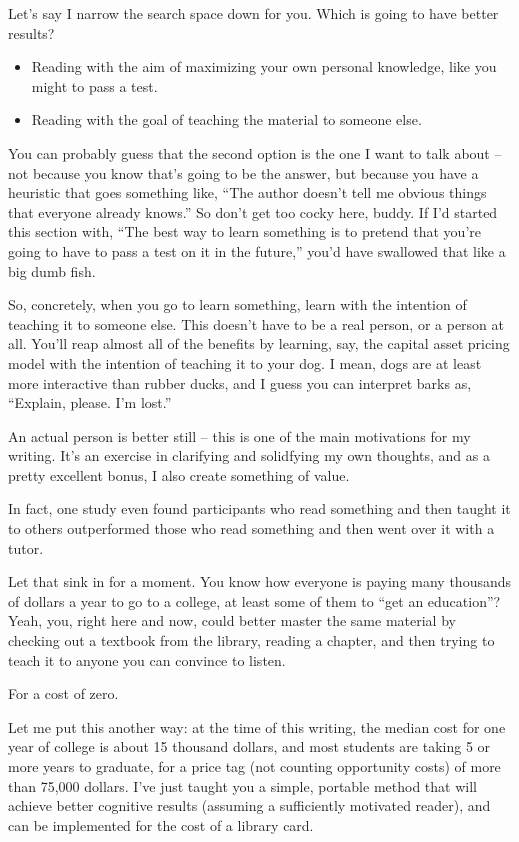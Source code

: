 Let's say I narrow the search space down for you. Which is going to have
better results?

\begin{itemize}
\itemsep1pt\parskip0pt
\item
  Reading with the aim of maximizing your own personal knowledge, like
  you might to pass a test.
\item
  Reading with the goal of teaching the material to someone else.
\end{itemize}

You can probably guess that the second option is the one I want to talk
about -- not because you know that's going to be the answer, but because
you have a heuristic that goes something like, ``The author doesn't tell
me obvious things that everyone already knows.'' So don't get too cocky
here, buddy. If I'd started this section with, ``The best way to learn
something is to pretend that you're going to have to pass a test on it
in the future,'' you'd have swallowed that like a big dumb fish.

So, concretely, when you go to learn something, learn with the intention
of teaching it to someone else. This doesn't have to be a real person,
or a person at all. You'll reap almost all of the benefits by learning,
say, the capital asset pricing model with the intention of teaching it
to your dog. I mean, dogs are at least more interactive than rubber
ducks, and I guess you can interpret barks as, ``Explain, please. I'm
lost.''

An actual person is better still -- this is one of the main motivations
for my writing. It's an exercise in clarifying and solidfying my own
thoughts, and as a pretty excellent bonus, I also create something of
value.

In fact, one study even found participants who read something and then
taught it to others outperformed those who read something and then went
over it with a tutor.

Let that sink in for a moment. You know how everyone is paying many
thousands of dollars a year to go to a college, at least some of them to
``get an education''? Yeah, you, right here and now, could better master
the same material by checking out a textbook from the library, reading a
chapter, and then trying to teach it to anyone you can convince to
listen.

For a cost of zero.

Let me put this another way: at the time of this writing, the median
cost for one year of college is about 15 thousand dollars, and most
students are taking 5 or more years to graduate, for a price tag (not
counting opportunity costs) of more than 75,000 dollars. I've just
taught you a simple, portable method that will achieve better cognitive
results (assuming a sufficiently motivated reader), and can be
implemented for the cost of a library card.


